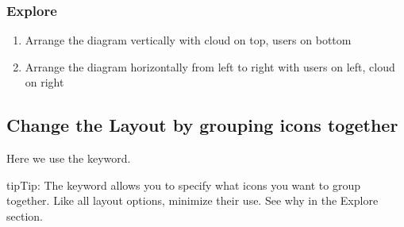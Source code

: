 \documentclass[letterpaper,10pt,english]{sphinxmanual}
\begin{document}
\subsubsection{Explore}
\label{\detokenize{NetworkUsersMachines/NetworkUsersMachines:id11}}\begin{enumerate}
%
\item {} 
Arrange the diagram vertically with cloud on top, users on bottom

\item {} 
Arrange the diagram horizontally from left to right with users on left, cloud on right

\end{enumerate}


\subsection{Change the Layout by grouping icons together}
\label{\detokenize{NetworkUsersMachines/NetworkUsersMachines:change-the-layout-by-grouping-icons-together}}
Here we use the  keyword.

\begin{sphinxadmonition}{tip}{Tip:}
The  keyword allows you to specify what icons you want to group together.
Like all layout options, minimize their use. See why in the Explore section.
\end{sphinxadmonition}

\begin{figure}[htbp]
\centering
\capstart

\caption{}\label{\detokenize{NetworkUsersMachines/NetworkUsersMachines:id22}}\end{figure}
\end{document}
